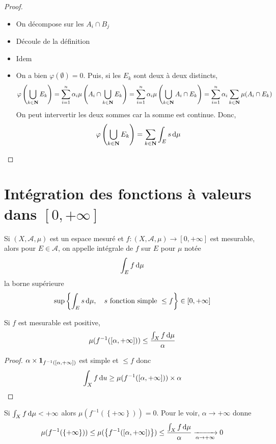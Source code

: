 \begin{proof}
\begin{itemize}
    \item On décompose sur les $A_i\cap B_j$ 
    \item Découle de la définition
    \item Idem
    \item On a bien $\varphi(\emptyset)=0$. Puis, si les  $E_k$ sont deux à deux distincts,  \[
            \varphi \left( \bigcup_{k \in  \mathbf N}E_k \right)=\sum_{i=1}^n \alpha_i \mu\left(A_i\cap \bigcup_{k \in  \mathbf N}E_k\right)=\sum_{i=1}^n \alpha_i \mu\left(\bigcup_{k \in  \mathbf N}A_i\cap E_k\right)=\sum_{i=1}^n \alpha_i \sum_{k \in  \mathbf N} \mu(A_i\cap E_k)
    \] 
    On peut intervertir les deux sommes car la somme est continue. Donc, \[
        \varphi \left( \bigcup_{k \in  \mathbf N}E_k \right)=\sum_{k \in  \mathbf N}\int_Es\mathop{}\!\mathrm d \mu
    \] 
\end{itemize}
\end{proof}

\section{Intégration des fonctions à valeurs dans \texorpdfstring{$[0, +\infty]$ }{[0,+inf]}}

\begin{dfn}
    Si $(X, \mathcal  A, \mu)$ est un espace mesuré et $f:(X, \mathcal  A, \mu)\longrightarrow [0, +\infty]$ est mesurable, alors pour $E \in  \mathcal  A$, on appelle intégrale de $f$ sur $E$ pour $\mu$ notée \[
    \int_E f\mathop{}\!\mathrm d \mu
    \]
    la borne supérieure \[
    \sup \left\{ \int_E s\mathop{}\!\mathrm d \mu, \quad  s \text{ fonction simple } \leq f \right\} \in  [0, +\infty]
    \] 
\end{dfn}

\begin{thm}
    Si $f$ est mesurable est positive, \[ \mu(f^{-1}([\alpha, +\infty])) \leq \frac{\int_Xf\mathop{}\!\mathrm d \mu}{\alpha} \]
\end{thm}

\begin{proof}
    $\alpha \times \bm{1}_{f^{-1} ([\alpha, +\infty])}$ est simple et $\leq f$ donc \[
        \int_Xf\mathop{}\!\mathrm d u\geq \mu(f^{-1} ([\alpha, +\infty]))\times \alpha
    \] 
\end{proof}

\begin{cor}
    Si $\int_Xf\mathop{}\!\mathrm d \mu<+\infty$ alors  $\mu(f^{-1}(\left\{ +\infty \right\} ))=0$. Pour le voir, $ \alpha\longrightarrow +\infty$ donne \[
        \mu(f^{-1}(\left\{ +\infty \right\} ))\leq \mu(\left\{ f^{-1}([\alpha, +\infty]) \right\} )\leq \frac{\int_Xf\mathop{}\!\mathrm d \mu}{\alpha} \xrightarrow[\alpha \to +\infty]{}0
    \]
\end{cor}


